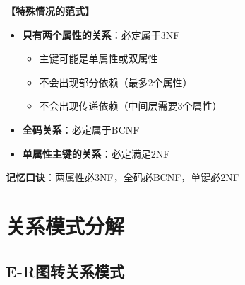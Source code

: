 \documentclass[12pt, a4paper]{article}
\newenvironment{bluebox}[1]{%
  \begin{trivlist}
  \item[\hskip\labelsep \textbf{#1}]
  \setlength{\parskip}{0.5ex}
  \setlength{\itemsep}{0.5ex}
}{%
  \end{trivlist}
  }
\begin{document}
\begin{bluebox}{特殊情况}
	\textbf{【特殊情况的范式】}

	\begin{itemize}
		\item \textbf{只有两个属性的关系}：必定属于3NF
		      \begin{itemize}
			      \item 主键可能是单属性或双属性
			      \item 不会出现部分依赖（最多2个属性）
			      \item 不会出现传递依赖（中间层需要3个属性）
		      \end{itemize}
		\item \textbf{全码关系}：必定属于BCNF
		\item \textbf{单属性主键的关系}：必定满足2NF
	\end{itemize}

	\textbf{记忆口诀}：两属性必3NF，全码必BCNF，单键必2NF
\end{bluebox}

\section{关系模式分解}

\subsection{E-R图转关系模式}
\end{document}

